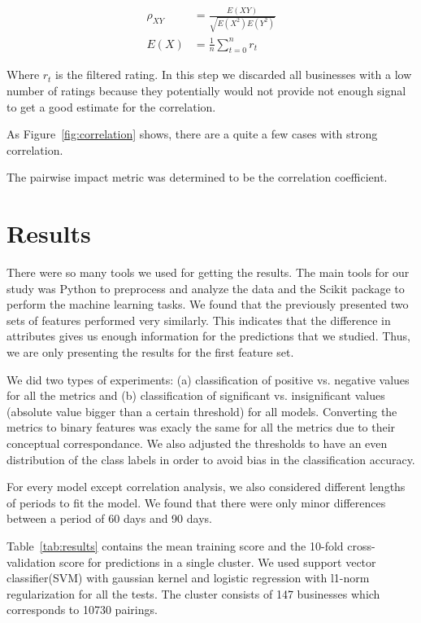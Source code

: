 \documentclass{vldb}
\begin{document}
\begin{align*}
    \rho_{XY} &= \frac{E(XY)}{\sqrt{E(X^2) E(Y^2)}} \\
    E(X) &= \frac{1}{n} \sum_{t = 0}^{n} r_t
\end{align*}

Where $r_t$ is the filtered rating.
In this step we discarded all businesses with a low number of ratings because they potentially would not provide not enough signal to get a good estimate for the correlation.

As Figure~\ref{fig:correlation} shows, there are a quite a few cases with strong correlation.

The pairwise impact metric was determined to be the correlation coefficient. 

\section{Results}
%
There were so many tools we used for getting the results. The main tools for our study was Python to preprocess and analyze the data and the Scikit package \cite{pedregosa2011scikit} to perform the machine learning tasks.
We found that the previously presented two sets of features performed very similarly.
This indicates that the difference in attributes gives us enough information for the predictions that we studied.
Thus, we are only presenting the results for the first feature set.


We did two types of experiments: (a) classification of positive vs. negative values for all the metrics and (b) classification of significant vs. insignificant values (absolute value bigger than a certain threshold) for all models. Converting the metrics to binary features was exacly the same for all the metrics due to their conceptual correspondance. We also adjusted the thresholds to have an even distribution of the class labels in order to avoid bias in the classification accuracy.

For every model except correlation analysis, we also considered different lengths of periods to fit the model.
We found that there were only minor differences between a period of 60 days and 90 days.

Table~\ref{tab:results} contains the mean training score and the 10-fold cross-validation score for predictions in a single cluster.
We used support vector classifier(SVM) with gaussian kernel and logistic regression with l1-norm regularization for all the tests.
The cluster consists of 147 businesses which corresponds to 10730 pairings.
\end{document}
